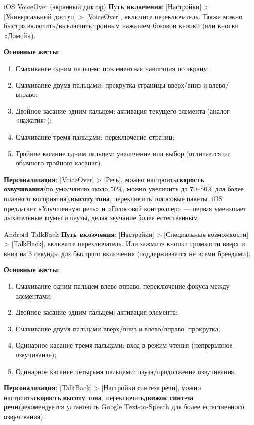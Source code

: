 \begin{tcbinfo}{iOS VoiceOver (экранный диктор)}
\textbf{Путь включения}: [Настройки] > [Универсальный доступ] > [VoiceOver], включите переключатель. Также можно быстро включить/выключить тройным нажатием боковой кнопки (или кнопки «Домой»).

\textbf{Основные жесты}:

\begin{enumerate}
  \item Смахивание одним пальцем: поэлементная навигация по экрану;
  \item Смахивание двумя пальцами: прокрутка страницы вверх/вниз и влево/вправо;
  \item Двойное касание одним пальцем: активация текущего элемента (аналог «нажатия»);
  \item Смахивание тремя пальцами: переключение страниц;
  \item Тройное касание одним пальцем: увеличение или выбор (отличается от обычного тройного касания).
\end{enumerate}

\textbf{Персонализация}: [VoiceOver] > [Речь], можно настроить\textbf{скорость озвучивания}(по умолчанию около 50\%, можно увеличить до 70–80\% для более плавного восприятия),\textbf{высоту тона}, переключить голосовые пакеты. iOS предлагает «Улучшенную речь» и «Голосовой контроллер» — первая уменьшает дыхательные шумы и паузы, делая звучание более естественным.

\end{tcbinfo}

\begin{tcbinfo}{Android TalkBack}
\textbf{Путь включения}: [Настройки] > [Специальные возможности] > [TalkBack], включите переключатель. Или зажмите кнопки громкости вверх и вниз на 3 секунды для быстрого включения (поддерживается не всеми брендами).

\textbf{Основные жесты}:

\begin{enumerate}
  \item Смахивание одним пальцем влево-вправо: переключение фокуса между элементами;
  \item Двойное касание одним пальцем: активация элемента;
  \item Смахивание двумя пальцами вверх/вниз и влево/вправо: прокрутка;
  \item Одинарное касание тремя пальцами: вход в режим чтения (непрерывное озвучивание);
  \item Одинарное касание четырьмя пальцами: пауза/продолжение озвучивания.
\end{enumerate}

\textbf{Персонализация}: [TalkBack] > [Настройки синтеза речи], можно настроить\textbf{скорость},\textbf{высоту тона}, переключить\textbf{движок синтеза речи}(рекомендуется установить Google Text-to-Speech для более естественного озвучивания).

\end{tcbinfo}

